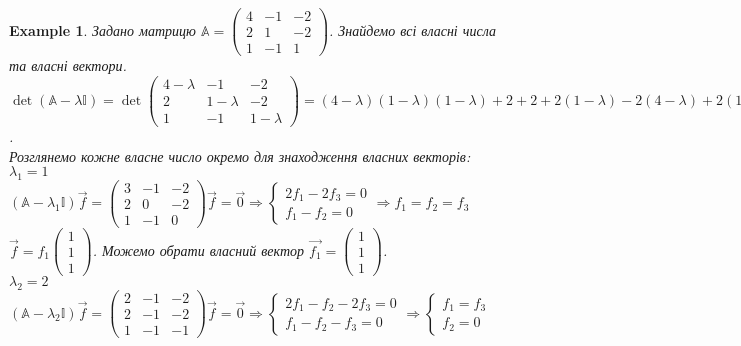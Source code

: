 \documentclass[a4paper, 10pt]{article}
\theoremstyle{theoremdd}
\theoremstyle{theoremdd}
\theoremstyle{theoremdd}
\theoremstyle{theoremdd}
\newtheorem{example}[theorem]{Example}
\theoremstyle{theoremdd}
\theoremstyle{theoremdd}
\theoremstyle{theoremdd}
\theoremstyle{theoremdd}
\begin{document}
\begin{example}
Задано матрицю $\mathbb{A} = \begin{pmatrix}
4 & -1 & -2 \\
2 & 1 & -2 \\
1 & -1 & 1
\end{pmatrix}$. Знайдемо всі власні числа та власні вектори.\\
$\det (\mathbb{A} - \lambda \mathbb{I}) = \det \begin{pmatrix}
4-\lambda & -1 & -2 \\
2 & 1-\lambda & -2 \\
1 & -1 & 1-\lambda
\end{pmatrix} = (4-\lambda)(1-\lambda)(1-\lambda) + 2 + 2 + 2(1-\lambda) -2(4-\lambda) +2(1-\lambda) = -\lambda^3 + 6 \lambda^2 - 11 \lambda + 6 = 0 \implies (\lambda - 1)(\lambda -2)(\lambda - 3) = 0$.\\
Розглянемо кожне власне число окремо для знаходження власних векторів:\\
$\lambda_1 = 1$\\
$(\mathbb{A} - \lambda_1 \mathbb{I})\vec{f} =\begin{pmatrix}
3 & -1 & -2 \\
2 & 0 & -2 \\
1 & -1 & 0
\end{pmatrix} \vec{f} = \vec{0} \Rightarrow \begin{cases} 2f_1 - 2f_3 = 0 \\ f_1 - f_2 = 0 \end{cases} \Rightarrow f_1 = f_2 = f_3$\\
$\vec{f} = f_1 \begin{pmatrix}
1 \\ 1 \\ 1
\end{pmatrix}$. Можемо обрати власний вектор $\vec{f_1} = \begin{pmatrix}
1 \\ 1 \\ 1
\end{pmatrix}$.
\bigskip \\
$\lambda_2 = 2$\\
$(\mathbb{A} - \lambda_2 \mathbb{I})\vec{f} =\begin{pmatrix}
2 & -1 & -2 \\
2 & -1 & -2 \\
1 & -1 & -1
\end{pmatrix} \vec{f} = \vec{0} \Rightarrow \begin{cases} 2f_1 - f_2 - 2f_3 = 0 \\ f_1 - f_2 - f_3 = 0 \end{cases} \Rightarrow \begin{cases} f_1 = f_3 \\ f_2 = 0 \end{cases}$\\

\end{example}
\end{document}
